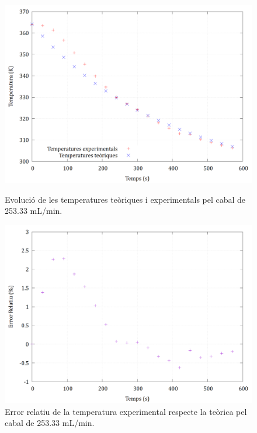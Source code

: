 \documentclass[10pt, twoside]{article}
\begin{document}
\begin{figure}[h!]
    \centering
    \begin{minipage}{0.45\linewidth}
        \centering
        \includegraphics[width=\linewidth]{253.png}
        \caption{Evolució de les temperatures teòriques i experimentals pel cabal de 253.33 mL/min.}
    \end{minipage}
    \hspace{0.05\linewidth}
    \begin{minipage}{0.45\linewidth}
        \centering
        \includegraphics[width=\linewidth]{253error.png}
        \caption{Error relatiu de la temperatura experimental respecte la teòrica pel cabal de 253.33 mL/min.}
    \end{minipage}
\end{figure}
\end{document}
